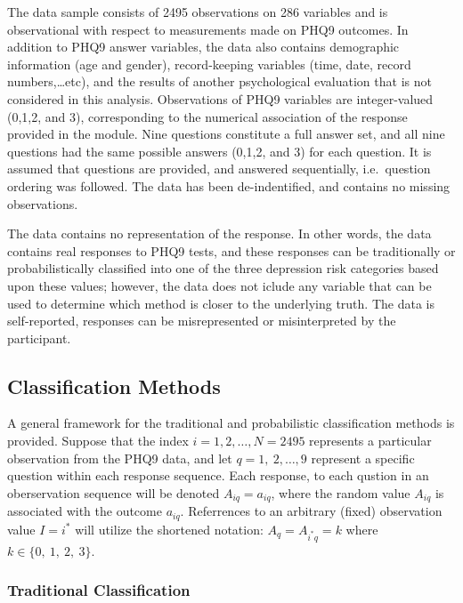 \documentclass[12pt,]{article}
\begin{document}
The data sample consists of 2495 observations on 286 variables and is
observational with respect to measurements made on PHQ9 outcomes. In
addition to PHQ9 answer variables, the data also contains demographic
information (age and gender), record-keeping variables (time, date,
record numbers,\ldots{}etc), and the results of another psychological
evaluation that is not considered in this analysis. Observations of PHQ9
variables are integer-valued (0,1,2, and 3), corresponding to the
numerical association of the response provided in the module. Nine
questions constitute a full answer set, and all nine questions had the
same possible answers (0,1,2, and 3) for each question. It is assumed
that questions are provided, and answered sequentially, i.e.~question
ordering was followed. The data has been de-indentified, and contains no
missing observations.

The data contains no representation of the response. In other words, the
data contains real responses to PHQ9 tests, and these responses can be
traditionally or probabilistically classified into one of the three
depression risk categories based upon these values; however, the data
does not iclude any variable that can be used to determine which method
is closer to the underlying truth. The data is self-reported, responses
can be misrepresented or misinterpreted by the participant.

\hypertarget{classification-methods}{%
\subsection{Classification Methods}\label{classification-methods}}

A general framework for the traditional and probabilistic classification
methods is provided. Suppose that the index \(i=1, 2, \ldots, N=2495\)
represents a particular observation from the PHQ9 data, and let
\(q=1, \ 2, \ldots, 9\) represent a specific question within each
response sequence. Each response, to each qustion in an oberservation
sequence will be denoted \(A_{iq}=a_{iq}\), where the random value
\(A_{iq}\) is associated with the outcome \(a_{iq}\). Referrences to an
arbitrary (fixed) observation value \(I=i^{*}\) will utilize the
shortened notation: \(A_{q}=A_{i^{*}q}=k\) where
\(k\in \{ 0,\ 1, \ 2, \ 3 \}\).

\hypertarget{traditional-classification}{%
\subsubsection{Traditional
Classification}\label{traditional-classification}}
\end{document}

